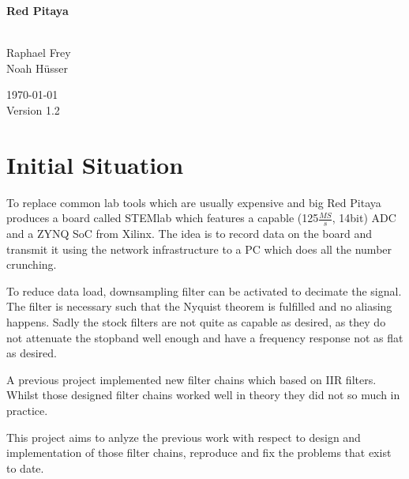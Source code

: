 \documentclass[a4paper,oneside]{alpenspecs/alpenspecs}
\begin{document}
\begin{titlingpage} %
    \flushright\sffamily

    \vspace*{5em}
    \Huge\bfseries{Red Pitaya}\\[1ex]
    \Large{}\\[3ex]

    \normalsize\mdseries

    \vfill
    Raphael Frey\\
    Noah H\"usser\\[3ex]

    \vspace{5em}

    \today\\
    Version 1.2
\end{titlingpage} %

\frontmatter %
\tableofcontents*

\mainmatter

\chapter{Initial Situation} %
\label{ch:initial}

To replace common lab tools which are usually expensive and big Red Pitaya produces a board called STEMlab which features a capable (125$\frac{MS}{s}$, 14bit) ADC and a ZYNQ SoC from Xilinx. The idea is to record data on the board and transmit it using the network infrastructure to a PC which does all the number crunching.

To reduce data load, downsampling filter can be activated to decimate the signal. The filter is necessary such that the Nyquist theorem is fulfilled and no aliasing happens. Sadly the stock filters are not quite as capable as desired, as they do not attenuate the stopband well enough and have a frequency response not as flat as desired.

A previous project implemented new filter chains which based on IIR filters. Whilst those designed filter chains worked well in theory they did not so much in practice.

This project aims to anlyze the previous work with respect to design and implementation of those filter chains, reproduce and fix the problems that exist to date.
\end{document}
